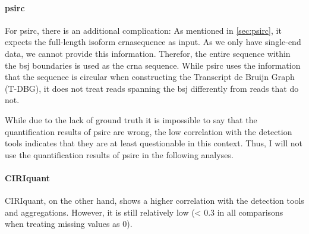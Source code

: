 \paragraph{psirc}
For psirc, there is an additional complication: As mentioned in
\cref{sec:psirc}, it expects the full-length isoform \gls{crna}sequence as
input.
As we only have single-end data, we cannot provide this information.
Therefor, the entire sequence within the \gls{bsj} boundaries is used as the
\gls{crna} sequence.
While psirc uses the information that the sequence is circular when
constructing the Transcript de Bruijn Graph (T-DBG), it does not treat reads
spanning the \gls{bsj} differently from reads that do
not\supercite{yu_quantifying_2021}.

While due to the lack of ground truth it is impossible to say that the
quantification results of psirc are wrong, the low correlation with the
detection tools indicates that they are at least questionable in this context.
Thus, I will not use the quantification results of psirc in the following
analyses.

\paragraph{CIRIquant}
CIRIquant, on the other hand, shows a higher correlation with the detection
tools and aggregations.
However, it is still relatively low (< 0.3 in all comparisons when treating
missing values as 0).
